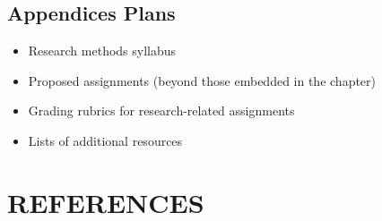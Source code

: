 \documentclass[
  11pt,
]{book}
\providecommand{\tightlist}{%
  \setlength{\itemsep}{0pt}\setlength{\parskip}{0pt}}
\begin{document}
\section{Appendices Plans}\label{appendices-plans}

\begin{itemize}
\tightlist
\item
  Research methods syllabus
\item
  Proposed assignments (beyond those embedded in the chapter)
\item
  Grading rubrics for research-related assignments
\item
  Lists of additional resources
\end{itemize}

\chapter*{REFERENCES}\label{references-2}


  
\end{document}

